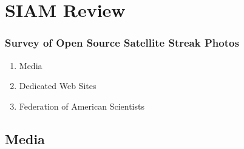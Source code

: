 % 

\section{SIAM Review}%
\begin{frame}\frametitle{Survey of Open Source Satellite Streak Photos}
\begin{enumerate}
	\item Media
	\item Dedicated Web Sites
	\item Federation of American Scientists
\end{enumerate}
\end{frame}


\subsection{Media}



\endinput  %

